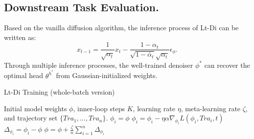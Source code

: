 \subsection{Downstream Task Evaluation.}
Based on the vanilla diffusion algorithm, the inference process of Lt-Di can be written as:
\begin{equation*}\label{eq:DDPM_inference}
x_{t-1}=\frac{1}{\sqrt{\alpha_t}}x_t - \frac{1 - \alpha_t}{\sqrt{1 - \bar{\alpha}_t} \sqrt{\alpha_t}}\epsilon_{\phi}.
\end{equation*}
Through multiple inference processes, the well-trained denoiser $\phi^*$ can recover the optimal head $\theta^{h^*}$ from Gaussian-initialized weights.



\begin{algorithm}[t]
\caption{Lt-Di Training (whole-batch version)}
\label{alg:training}
\begin{algorithmic}[1]
    \REQUIRE Initial model weights $\phi$, inner-loop steps $K$, learning rate $\eta$, meta-learning rate $\zeta$, and trajectory set $\{Tra_1, ..., Tra_n\}$.
            \STATE $\phi_i = \phi$
                \STATE $\phi_i = \phi_i - \eta \alpha \nabla_{\phi_i}L(\phi_i, Tra_i, t)$
            \ENDFOR
            \STATE $\Delta_{\phi_i} = \phi_i - \phi$
        \ENDFOR
        \STATE $\phi = \phi + \frac{\zeta}{n}\sum_{i=1}^n \Delta_{\phi_i}$
    \ENDWHILE
\end{algorithmic}
\end{algorithm}








